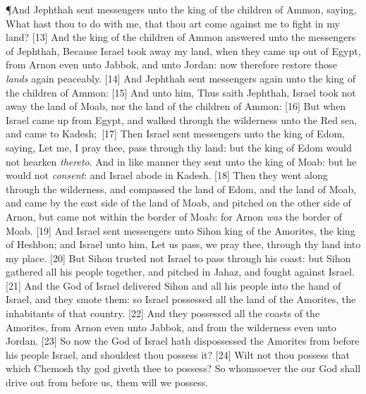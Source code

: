 \P \textcolor[cmyk]{0.99998,1,0,0}{And Jephthah sent messengers unto the king of the children of Ammon, saying, What hast thou to do with me, that thou art come against me to fight in my land?}
[13] \textcolor[cmyk]{0.99998,1,0,0}{And the king of the children of Ammon answered unto the messengers of Jephthah, Because Israel took away my land, when they came up out of Egypt, from Arnon even unto Jabbok, and unto Jordan: now therefore restore those \emph{lands} again peaceably.}
[14] \textcolor[cmyk]{0.99998,1,0,0}{And Jephthah sent messengers again unto the king of the children of Ammon:}
[15] \textcolor[cmyk]{0.99998,1,0,0}{And  unto him, Thus saith Jephthah, Israel took not away the land of Moab, nor the land of the children of Ammon:}
[16] \textcolor[cmyk]{0.99998,1,0,0}{But when Israel came up from Egypt, and walked through the wilderness unto the Red sea, and came to Kadesh;}\
[17] \textcolor[cmyk]{0.99998,1,0,0}{Then Israel sent messengers unto the king of Edom, saying, Let me, I pray thee, pass through thy land: but the king of Edom would not hearken \emph{thereto}. And in like manner they sent unto the king of Moab: but he would not \emph{consent}: and Israel abode in Kadesh.}
[18] \textcolor[cmyk]{0.99998,1,0,0}{Then they went along through the wilderness, and compassed the land of Edom, and the land of Moab, and came by the east side of the land of Moab, and pitched on the other side of Arnon, but came not within the border of Moab: for Arnon \emph{was} the border of Moab.}
[19] \textcolor[cmyk]{0.99998,1,0,0}{And Israel sent messengers unto Sihon king of the Amorites, the king of Heshbon; and Israel \fcolorbox{bone}{bone}{said} unto him, Let us pass, we pray thee, through thy land into my place.}
[20] \textcolor[cmyk]{0.99998,1,0,0}{But Sihon trusted not Israel to pass through his coast: but Sihon gathered all his people together, and pitched in Jahaz, and fought against Israel.}
[21] \textcolor[cmyk]{0.99998,1,0,0}{And the \fcolorbox{bone}{bone}{LORD} God of Israel delivered Sihon and all his people into the hand of Israel, and they smote them: so Israel possessed all the land of the Amorites, the inhabitants of that country.}
[22] \textcolor[cmyk]{0.99998,1,0,0}{And they possessed all the coasts of the Amorites, from Arnon even unto Jabbok, and from the wilderness even unto Jordan.}
[23] \textcolor[cmyk]{0.99998,1,0,0}{So now the \fcolorbox{bone}{bone}{LORD} God of Israel hath dispossessed the Amorites from before his people Israel, and shouldest thou possess it?}
[24] \textcolor[cmyk]{0.99998,1,0,0}{Wilt not thou possess that which Chemosh thy god giveth thee to possess? So whomsoever the \fcolorbox{bone}{bone}{LORD} our God shall drive out from before us, them will we possess.}
